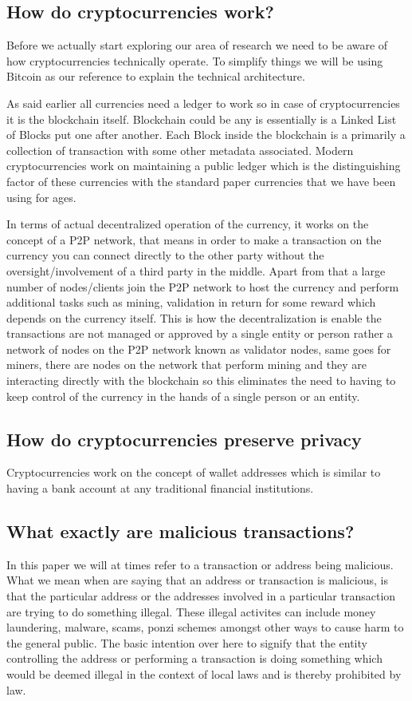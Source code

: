 \documentclass{article}
\begin{document}
\subsection{How do cryptocurrencies work?}
Before we actually start exploring our area of research we need to be aware of how cryptocurrencies technically operate. To simplify things we will be using Bitcoin as our reference to explain the technical architecture.

As said earlier all currencies need a ledger to work so in case of cryptocurrencies it is the blockchain itself. Blockchain could be any is essentially is a Linked List \cite{} of Blocks put one after another. Each Block inside the blockchain is a primarily a collection of transaction with some other metadata associated. Modern cryptocurrencies work on maintaining a public ledger which is the distinguishing factor of these currencies with the standard paper currencies that we have been using for ages. 

In terms of actual decentralized operation of the currency, it works on the concept of a P2P network, that means in order to make a transaction on the currency you can connect directly to the other party without the oversight/involvement of a third party in the middle. Apart from that a large number of nodes/clients join the P2P network to host the currency and perform additional tasks such as mining, validation in return for some reward which depends on the currency itself. This is how the decentralization is enable the transactions are not managed or approved by a single entity or person rather a network of nodes on the P2P network known as validator nodes, same goes for miners, there are nodes on the network that perform mining and they are interacting directly with the blockchain so this eliminates the need to having to keep control of the currency in the hands of a single person or an entity.

\subsection{How do cryptocurrencies preserve privacy}

Cryptocurrencies work on the concept of wallet addresses which is similar to having a bank account at any traditional financial institutions. 

\subsection{What exactly are malicious transactions?}
In this paper we will at times refer to a transaction or address being malicious. What we mean when are saying that an address or transaction is malicious, is that the particular address or the addresses involved in a particular transaction are trying to do something illegal. These illegal activites can include money laundering, malware, scams, ponzi schemes amongst other ways to cause harm to the general public. The basic intention over here to signify that the entity controlling the address or performing a transaction is doing something which would be deemed illegal in the context of local laws and is thereby prohibited by law. 
\end{document}
